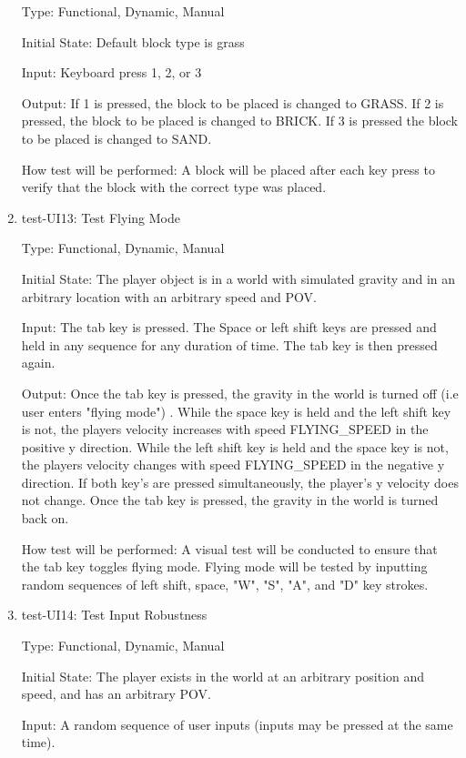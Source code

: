 \documentclass[12pt, titlepage]{article}
\begin{document}
\begin{enumerate}
Type: Functional, Dynamic, Manual
					
Initial State: Default block type is grass
					
Input: Keyboard press 1, 2, or 3
					
Output: If 1 is pressed, the block to be placed is changed to GRASS. If 2 is pressed, the block to be placed is changed to BRICK. If 3 is pressed the block to be placed is changed to SAND.
					
How test will be performed: A block will be placed after each key press to verify that the block with the correct type was placed.

\item{test-UI13: Test Flying Mode\\}

Type: Functional, Dynamic, Manual
					
Initial State: The player object is in a world with simulated gravity and in an arbitrary location with an arbitrary speed and POV.
					
Input: The tab key is pressed. The Space or left shift keys are pressed and held in any sequence for any duration of time. The tab key is then pressed again.
					
Output: Once the tab key is pressed, the gravity in the world is turned off (i.e user enters "flying mode") . While the space key is held and the left shift key is not, the players velocity increases with speed FLYING\_SPEED in the positive y direction. While the left shift key is held and the space key is not, the players velocity changes with speed FLYING\_SPEED in the negative y direction. If both key's are pressed simultaneously, the player's y velocity does not change. Once the tab key is pressed, the gravity in the world is turned back on.
					
How test will be performed: A visual test will be conducted to ensure that the tab key toggles flying mode. Flying mode will be tested by inputting random sequences of left shift, space, "W", "S", "A", and "D" key strokes.

\item{test-UI14: Test Input Robustness\\}

Type: Functional, Dynamic, Manual
					
Initial State: The player exists in the world at an arbitrary position and speed, and has an arbitrary POV.
					
Input: A random sequence of user inputs (inputs may be pressed at the same time).
					

\end{enumerate}
\end{document}
